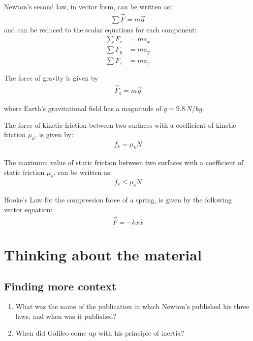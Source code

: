 \begin{importantEquations}
Newton's second law, in vector form, can be written as:
\begin{align*}
\sum \vec F = m\vec a
\end{align*}
and can be reduced to the scalar equations for each component:
\begin{align*}
\sum F_x &= ma_x \\
\sum F_y &= ma_y \\
\sum F_z &= ma_z
\end{align*}

The force of gravity is given by
\begin{align*}
\vec F_g = m\vec g
\end{align*}

where Earth's gravitational field has a magnitude of $g=\SI{9.8}{N/kg}$.

The force of kinetic friction between two surfaces with a coefficient of kinetic friction $\mu_k$, is given by:
\begin{align*}
f_k=\mu_kN
\end{align*}

The maximum value of static friction between two surfaces with a coefficient of static friction $\mu_s$, can be written as:
\begin{align*}
f_s\leq\mu_sN
\end{align*}

Hooke's Law for the compression force of a spring, is given by the following vector equation:
\begin{align*}
\vec F = -kx \hat x
\end{align*}
\end{importantEquations}

\section{Thinking about the material}

\subsection{Finding more context}
\begin{enumerate}
\item What was the name of the publication in which Newton's published his three laws, and when was it published?
\item When did Galileo come up with his principle of inertia?
\end{enumerate}

